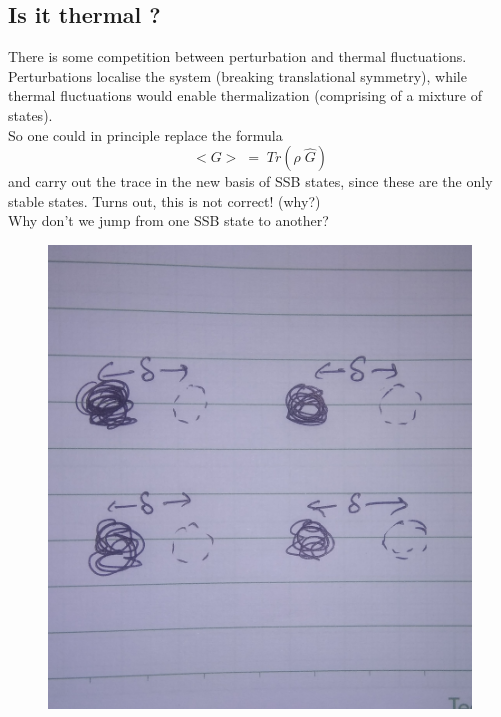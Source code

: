 \documentclass[12pt]{article}
\begin{document}
\newpage
\subsection{Is it thermal ?}
There is some competition between perturbation and thermal fluctuations.\\
Perturbations localise the system (breaking translational symmetry), while thermal fluctuations would enable thermalization (comprising of a mixture of states).\\
So one could in principle replace the formula
\begin{equation*}
    <G>\;=\;Tr(\rho \;\hat{G})
\end{equation*}
and carry out the trace in the new basis of SSB states, since these are the only stable states. Turns out, this is not correct! (why?)\\
\newline
Why don't we jump from one SSB state to another?\\

\begin{figure}[h]
\centering
\includegraphics[scale=0.1]{IMG_20200722_230039.jpg}
\end{figure}
\end{document}
